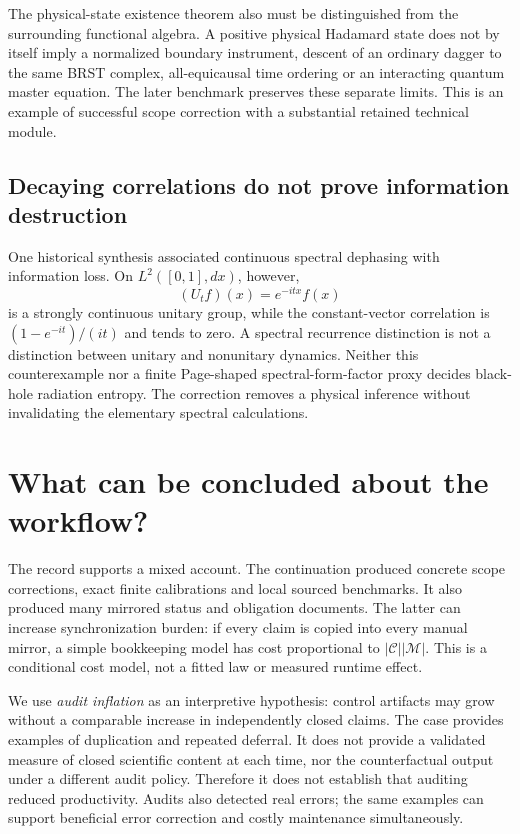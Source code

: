 \documentclass[11pt,a4paper]{article}
\begin{document}
The physical-state existence theorem also must be distinguished from the
surrounding functional algebra. A positive physical Hadamard state does not
by itself imply a normalized boundary instrument, descent of an ordinary
dagger to the same BRST complex, all-equicausal time ordering or an interacting
quantum master equation. The later benchmark preserves these separate limits.
This is an example of successful scope correction with a substantial retained
technical module.

\subsection{Decaying correlations do not prove information destruction}
One historical synthesis associated continuous spectral dephasing with
information loss. On $L^2([0,1],dx)$, however,
\begin{equation}
(U_tf)(x)=e^{-itx}f(x)
\end{equation}
is a strongly continuous unitary group, while the constant-vector correlation
is $(1-e^{-it})/(it)$ and tends to zero. A spectral recurrence distinction
is not a distinction between unitary and nonunitary dynamics. Neither this
counterexample nor a finite Page-shaped spectral-form-factor proxy decides
black-hole radiation entropy. The correction removes a physical inference
without invalidating the elementary spectral calculations.

\section{What can be concluded about the workflow?}
The record supports a mixed account. The continuation produced concrete
scope corrections, exact finite calibrations and local sourced benchmarks.
It also produced many mirrored status and obligation documents. The latter
can increase synchronization burden: if every claim is copied into every
manual mirror, a simple bookkeeping model has cost proportional to
$|\mathcal C||\mathcal M|$. This is a conditional cost model, not a fitted
law or measured runtime effect.

We use \emph{audit inflation} as an interpretive hypothesis: control artifacts
may grow without a comparable increase in independently closed claims.
The case provides examples of duplication and repeated deferral. It does
not provide a validated measure of closed scientific content at each time,
nor the counterfactual output under a different audit policy. Therefore it
does not establish that auditing reduced productivity. Audits also detected
real errors; the same examples can support beneficial error correction and
costly maintenance simultaneously.
\end{document}
